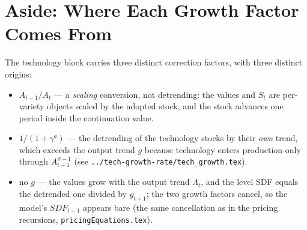 \documentclass[11pt]{article}
\begin{document}
\section{Aside: Where Each Growth Factor Comes From}

The technology block carries three distinct correction factors, with three
distinct origins:
\begin{itemize}
    \item $A_{t-1}/A_t$ --- a \emph{scaling} conversion, not detrending: the
    values and $S_t$ are per-variety objects scaled by the adopted stock, and the
    stock advances one period inside the continuation value.
    \item $1/(1+\gamma^{a})$ --- the detrending of the technology stocks by their
    \emph{own} trend, which exceeds the output trend $g$ because technology
    enters production only through $A_{t-1}^{\vartheta-1}$ (see
    \texttt{../tech-growth-rate/tech\_growth.tex}).
    \item no $g$ --- the values grow with the output trend $\Lambda_t$, and the
    level SDF equals the detrended one divided by $g_{t+1}$; the two growth
    factors cancel, so the model's $\mathit{SDF}_{t+1}$ appears bare (the same
    cancellation as in the pricing recursions, \texttt{pricingEquations.tex}).
\end{itemize}
\end{document}
